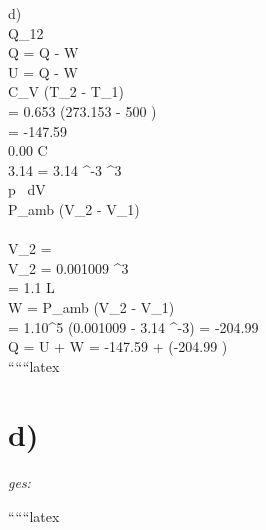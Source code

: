 d) \\
 Q_{12} \\

\Delta Q = Q - W \\

\Delta U = Q - W \\

C_V (T_2 - T_1) \\

= 0.653 (273.153 - 500 ) \\

= -147.59  \\

0.00 \degree C   \\

3.14  = 3.14 ^{-3} ^3 \\

\int p \, dV \\

P_{amb} (V_2 - V_1) \\

  \\

V_2 =  \\

V_2 = 0.001009 ^3 \\

= 1.1 L \\

W = P_{amb} (V_2 - V_1) \\

= 1.10^5 \left(0.001009 - 3.14 ^{-3}\right) = -204.99  \\

Q = \Delta U + W = -147.59  + (-204.99 ) \\

``````latex



\section*{d)}

\textit{ges:}

``````latex